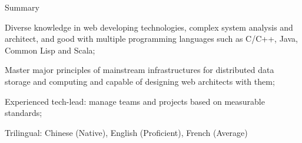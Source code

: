 \documentclass{resume} %
\begin{document}
\begin{rSection}{Summary}

\item Diverse knowledge in web developing technologies, complex system analysis and architect, and good with multiple programming languages such as C/C++, Java, Common Lisp and Scala;
\item Master major principles of mainstream infrastructures for distributed data storage and computing and capable of designing web architects with them;
\item Experienced tech-lead: manage teams and projects based on measurable standards;
\item Trilingual: Chinese (Native), English (Proficient), French (Average)

\end{rSection}





\end{document}
